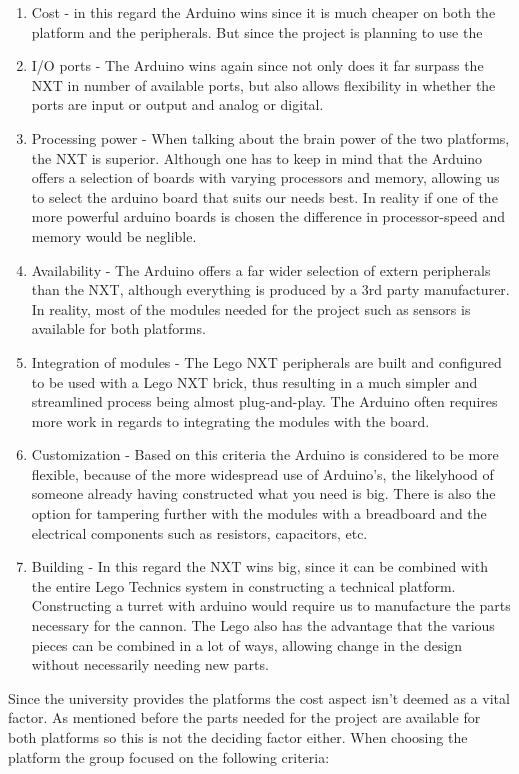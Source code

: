 \begin{enumerate}
  \item Cost - in this regard the Arduino wins since it is much cheaper on both the platform and the peripherals. But since the project is planning to use
  the
  \item I/O ports - The Arduino wins again since not only does it far surpass the NXT in number of available ports,
  but also allows flexibility in whether the ports are input or output and analog or digital.
  \item Processing power - When talking about the brain power of the two platforms, the NXT is superior. Although one has to
  keep in mind that the Arduino offers a selection of boards with varying processors and memory, allowing us to select the arduino
  board that suits our needs best. In reality if one of the more powerful arduino boards is chosen the difference in processor-speed and memory
  would be neglible.
  \item Availability - The Arduino offers a far wider selection of extern peripherals than the NXT, although everything is produced by a 3rd party manufacturer.
  In reality, most of the modules needed for the project such as sensors is available for both platforms.
  \item Integration of modules - The Lego NXT peripherals are built and configured to be used with a Lego NXT brick, thus resulting in a much simpler
  and streamlined process being almost plug-and-play. The Arduino often requires more work in regards to integrating the modules with the board.
  \item Customization - Based on this criteria the Arduino is considered to be more flexible, because of the more widespread use of Arduino's, the likelyhood of someone
  already having constructed what you need is big. There is also the option for tampering further with the modules with a breadboard and the electrical components such as resistors, capacitors, etc.
  \item Building - In this regard the NXT wins big, since it can be combined with the entire Lego Technics system in constructing a technical platform. Constructing a turret with arduino would
  require us to manufacture the parts necessary for the cannon. The Lego also has the advantage that the various pieces can be combined in a lot of ways, allowing change in the design without necessarily needing new parts.
\end{enumerate}

Since the university provides the platforms the cost aspect isn't deemed as a vital factor. As mentioned before the parts needed for the project
are available for both platforms so this is not the deciding factor either. When choosing the platform the group focused on the following criteria:

